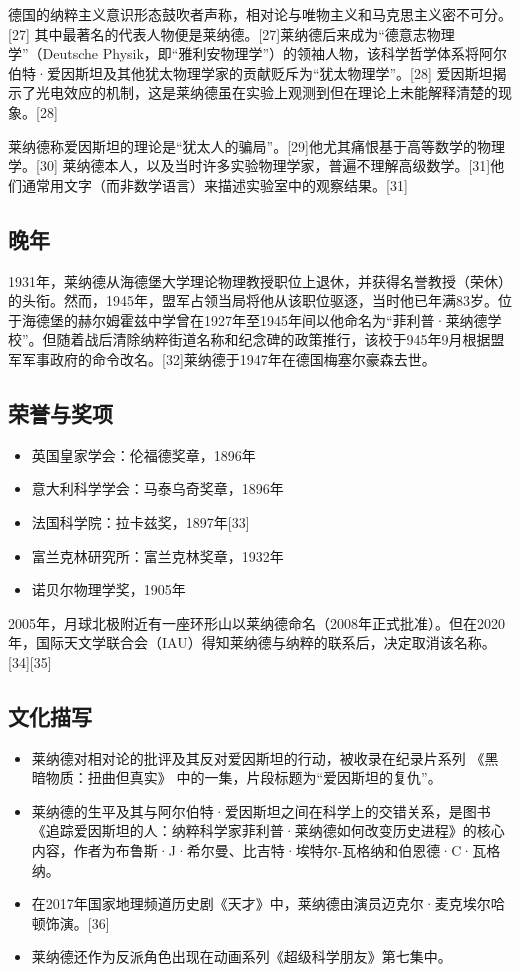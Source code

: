 德国的纳粹主义意识形态鼓吹者声称，相对论与唯物主义和马克思主义密不可分。[27] 其中最著名的代表人物便是莱纳德。[27]莱纳德后来成为“德意志物理学”（Deutsche Physik，即“雅利安物理学”）的领袖人物，该科学哲学体系将阿尔伯特·爱因斯坦及其他犹太物理学家的贡献贬斥为“犹太物理学”。[28] 爱因斯坦揭示了光电效应的机制，这是莱纳德虽在实验上观测到但在理论上未能解释清楚的现象。[28]

莱纳德称爱因斯坦的理论是“犹太人的骗局”。[29]他尤其痛恨基于高等数学的物理学。[30] 莱纳德本人，以及当时许多实验物理学家，普遍不理解高级数学。[31]他们通常用文字（而非数学语言）来描述实验室中的观察结果。[31]
\subsection{晚年}
1931年，莱纳德从海德堡大学理论物理教授职位上退休，并获得名誉教授（荣休）的头衔。然而，1945年，盟军占领当局将他从该职位驱逐，当时他已年满83岁。位于海德堡的赫尔姆霍兹中学曾在1927年至1945年间以他命名为“菲利普·莱纳德学校”。但随着战后清除纳粹街道名称和纪念碑的政策推行，该校于945年9月根据盟军军事政府的命令改名。[32]莱纳德于1947年在德国梅塞尔豪森去世。
\subsection{荣誉与奖项}
\begin{itemize}
\item 英国皇家学会：伦福德奖章，1896年
\item 意大利科学学会：马泰乌奇奖章，1896年
\item 法国科学院：拉卡兹奖，1897年[33]
\item 富兰克林研究所：富兰克林奖章，1932年
\item 诺贝尔物理学奖，1905年
\end{itemize}
2005年，月球北极附近有一座环形山以莱纳德命名（2008年正式批准）。但在2020年，国际天文学联合会（IAU）得知莱纳德与纳粹的联系后，决定取消该名称。[34][35]
\subsection{文化描写}
\begin{itemize}
\item 莱纳德对相对论的批评及其反对爱因斯坦的行动，被收录在纪录片系列 《黑暗物质：扭曲但真实》 中的一集，片段标题为“爱因斯坦的复仇”。
\item 莱纳德的生平及其与阿尔伯特·爱因斯坦之间在科学上的交错关系，是图书 《追踪爱因斯坦的人：纳粹科学家菲利普·莱纳德如何改变历史进程》的核心内容，作者为布鲁斯·J·希尔曼、比吉特·埃特尔-瓦格纳和伯恩德·C·瓦格纳。
\item 在2017年国家地理频道历史剧《天才》中，莱纳德由演员迈克尔·麦克埃尔哈顿饰演。[36]
\item 莱纳德还作为反派角色出现在动画系列《超级科学朋友》第七集中。
\end{itemize}
